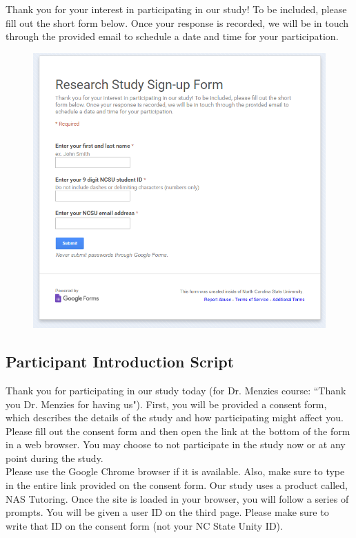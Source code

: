 \documentclass{sig-alternate-05-2015}
\begin{document}
\noindent Thank you for your interest in participating in our study! To be included, please fill out the short form below. Once your response is recorded, we will be in touch through the provided email to schedule a date and time for your participation.

\begin{figure}[!h]
    \centering
    \includegraphics[width=\linewidth]{appendix/signup_form.png}
\end{figure}

\subsection{Participant Introduction Script}

\noindent Thank you for participating in our study today (for Dr. Menzies course: ``Thank you Dr. Menzies for having us"). First, you will be provided a consent form, which describes the details of the study and how participating might affect you. Please fill out the consent form and then open the link at the bottom of the form in a web browser. You may choose to not participate in the study now or at any point during the study.\\

\noindent Please use the Google Chrome browser if it is available. Also, make sure to type in the entire link provided on the consent form. Our study uses a product called, NAS Tutoring. Once the site is loaded in your browser, you will follow a series of prompts. You will be given a user ID on the third page. Please make sure to write that ID on the consent form (not your NC State Unity ID).\\
\end{document}
